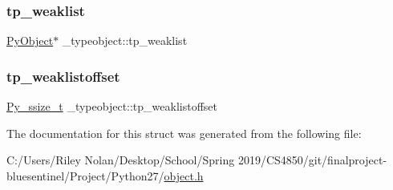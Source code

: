 \subsubsection{\texorpdfstring{tp\_weaklist}{tp\_weaklist}}
{\footnotesize\ttfamily \mbox{\hyperlink{_python27_2object_8h_aadc84ac7aed2cfa6f20c25f62bf3dac7}{Py\+Object}}$\ast$ \+\_\+typeobject\+::tp\+\_\+weaklist}

\mbox{\label{struct__typeobject_ae5742c033af6f3a7ad8389b0eb0ef362}} 
\subsubsection{\texorpdfstring{tp\_weaklistoffset}{tp\_weaklistoffset}}
{\footnotesize\ttfamily \mbox{\hyperlink{pyport_8h_ac6411a3dfda9ac6feb9e8d859b1184bc}{Py\+\_\+ssize\+\_\+t}} \+\_\+typeobject\+::tp\+\_\+weaklistoffset}



The documentation for this struct was generated from the following file\+:\begin{DoxyCompactItemize}
\item 
C\+:/\+Users/\+Riley Nolan/\+Desktop/\+School/\+Spring 2019/\+C\+S4850/git/finalproject-\/bluesentinel/\+Project/\+Python27/\mbox{\hyperlink{_python27_2object_8h}{object.\+h}}\end{DoxyCompactItemize}
